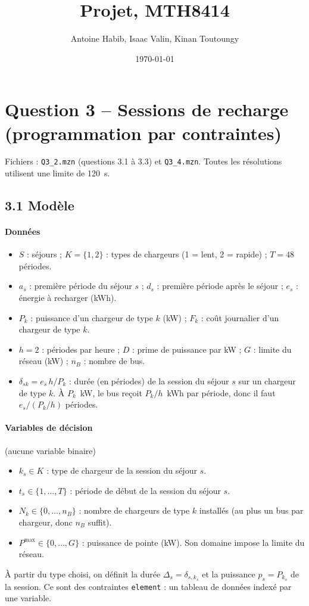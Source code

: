 \documentclass{article}
\title{Projet, MTH8414}
\author{Antoine Habib, Isaac Valin, Kinan Toutoungy}
\date{\today}
\begin{document}
\maketitle

\section*{Question 3 -- Sessions de recharge (programmation par contraintes)}

Fichiers : \texttt{Q3\_2.mzn} (questions 3.1 à 3.3) et \texttt{Q3\_4.mzn}. Toutes les résolutions utilisent une limite de 120~s.

\subsection*{3.1 Modèle}

\paragraph{Données}
\begin{itemize}
  \item $S$ : séjours ; $K = \{1, 2\}$ : types de chargeurs (1 = lent, 2 = rapide) ; $T = 48$ périodes.
  \item $a_s$ : première période du séjour $s$ ; $d_s$ : première période après le séjour ; $e_s$ : énergie à recharger (kWh).
  \item $P_k$ : puissance d'un chargeur de type $k$ (kW) ; $F_k$ : coût journalier d'un chargeur de type $k$.
  \item $h = 2$ : périodes par heure ; $D$ : prime de puissance par kW ; $G$ : limite du réseau (kW) ; $n_B$ : nombre de bus.
  \item $\delta_{sk} = e_s\,h / P_k$ : durée (en périodes) de la session du séjour $s$ sur un chargeur de type $k$. À $P_k$~kW, le bus reçoit $P_k/h$~kWh par période, donc il faut $e_s/(P_k/h)$ périodes.
\end{itemize}

\paragraph{Variables de décision} (aucune variable binaire)
\begin{itemize}
  \item $k_s \in K$ : type de chargeur de la session du séjour $s$.
  \item $t_s \in \{1, \dots, T\}$ : période de début de la session du séjour $s$.
  \item $N_k \in \{0, \dots, n_B\}$ : nombre de chargeurs de type $k$ installés (au plus un bus par chargeur, donc $n_B$ suffit).
  \item $P^{\max} \in \{0, \dots, G\}$ : puissance de pointe (kW). Son domaine impose la limite du réseau.
\end{itemize}
À partir du type choisi, on définit la durée $\Delta_s = \delta_{s,k_s}$ et la puissance $p_s = P_{k_s}$ de la session. Ce sont des contraintes \texttt{element} : un tableau de données indexé par une variable.
\end{document}
